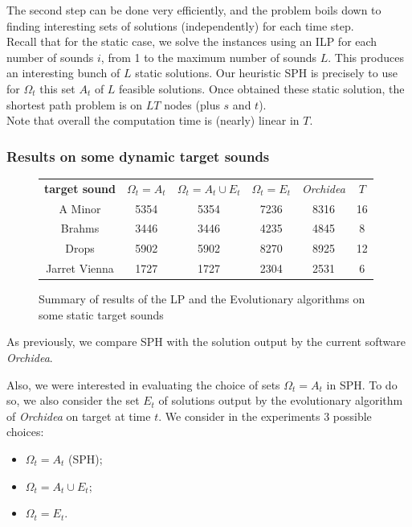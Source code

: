 \documentclass[a4paper]{book}
\begin{document}
The second step can be done very efficiently, and the problem boils down to finding interesting sets of solutions (independently) for each time step. \\
Recall that for the static case, we solve the instances using an ILP for each number of sounds $i$, from 1 to the maximum number of sounds $L$. This produces an interesting bunch of $L$ static solutions. Our heuristic SPH is precisely to use for $\Omega_t$ this set $A_t$ of $L$ feasible solutions. Once obtained these static solution, the shortest path problem is on $LT$ nodes (plus $s$ and $t$). \\
Note that overall the computation time is (nearly) linear in $T$.  


\subsubsection{Results on some dynamic target sounds}

\begin{figure}[ht!]
\centering
\begin{tabular}{c||c|c|c|c|c}%
     \textbf{target sound}&$\Omega_t=A_t$&$\Omega_t=A_t\cup E_t$&$\Omega_t=E_t$  &\textit{Orchidea}&$T$\\
A Minor&5354&5354&7236&8316&16\\
Brahms&3446&3446&4235&4845&8\\
Drops&5902&5902&8270&8925&12\\
Jarret Vienna&1727&1727&2304&2531&6\\

 
\end{tabular}
\caption{Summary of results of the LP and the Evolutionary algorithms on some static target sounds }
\label{tab:resultstat}
\end{figure}


As previously, we compare SPH with the solution output by the current software \textit{Orchidea}. 


Also, we were interested in evaluating the choice of sets $\Omega_t=A_t$ in SPH. To do so, we also consider the set $E_t$ of solutions output by the evolutionary algorithm of \textit{Orchidea} on target at time $t$. We consider in the experiments 3 possible choices:
\begin{itemize}
    \item $\Omega_t=A_t$ (SPH);
    \item $\Omega_t=A_t\cup E_t$;
    \item $\Omega_t=E_t$.
\end{itemize}
\end{document}
